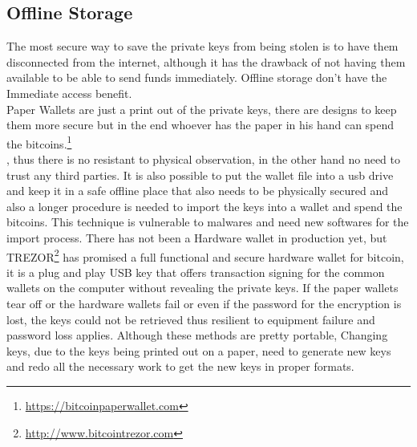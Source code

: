 
\subsection{Offline Storage}
\label{sec:offline storage}
The most secure way to save the private keys from being stolen is to have them disconnected from the internet, although it has the drawback of not having them available to be able to send funds immediately. Offline storage don't have the Immediate access benefit.\\
Paper Wallets are just a print out of the private keys, there are designs to keep them more secure but in the end whoever has the paper in his hand can spend the bitcoins.\footnote{\url {https://bitcoinpaperwallet.com}}\\, thus there is no resistant to physical observation, in the other hand no need to trust any third parties.
It is also possible to put the wallet file into a usb drive and keep it in a safe offline place that also needs to be physically secured and also a longer procedure is needed to import the keys into a wallet and spend the bitcoins. This technique is vulnerable to malwares and need new softwares for the import process. There has not been a Hardware wallet in production yet, but TREZOR\footnote{\url {http://www.bitcointrezor.com}} has promised a full functional and secure hardware wallet for bitcoin, it is a plug and play USB key that offers transaction signing for the common wallets on the computer without revealing the private keys. If the paper wallets tear off or the hardware wallets fail or even if the password for the encryption is lost, the keys could not be retrieved thus resilient to equipment failure and password loss applies. Although these methods are pretty portable, Changing keys, due to the keys being printed out on a paper, need to generate new keys and redo all the necessary work to get the new keys in proper formats.

